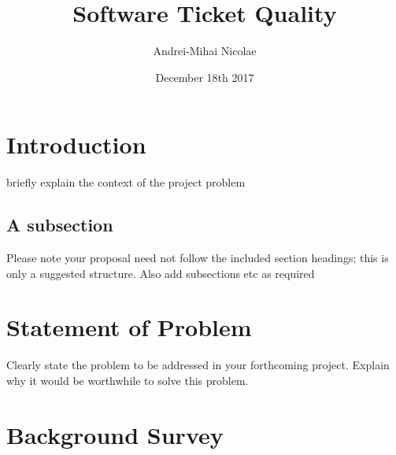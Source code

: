 \documentclass{mprop}
\begin{document}
\title{Software Ticket Quality}
\author{Andrei-Mihai Nicolae}
\date{December 18th 2017}
\maketitle

\tableofcontents
\newpage




\section{Introduction}\label{intro}

briefly explain the context of the project problem

\subsection{A subsection}
Please note your proposal need not follow the included section headings; this is only a suggested structure. Also add subsections etc as required

\section{Statement of Problem}

Clearly state the problem to be addressed in your forthcoming project.
Explain why it would be worthwhile to solve this problem.

\section{Background Survey}
\end{document}

